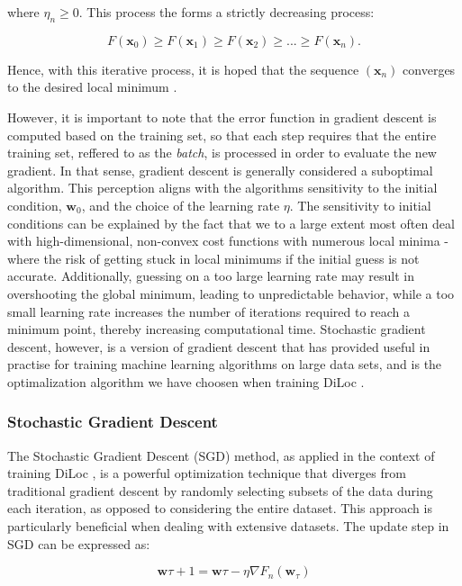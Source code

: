 \documentclass[a4paper, UKenglish, 11pt]{uiomaster}
\begin{document}
where $\eta_n \ge 0$. This process the forms a strictly decreasing process:

\begin{equation}
F(\textbf{x}_0) \ge F(\textbf{x}_1) \ge F(\textbf{x}_2) \ge ... \ge F(\textbf{x}_n).
\end{equation}

Hence, with this iterative process, it is hoped that the sequence $(\textbf{x}_n)$ converges to the desired local minimum \cite{wiki-gradient-descent}.

However, it is important to note that the error function in gradient descent is computed based on the training set, so that each step requires that the entire training set, reffered to as the \emph{batch}, is processed in order to evaluate the new gradient. In that sense, gradient descent is generally considered a suboptimal algorithm. This perception aligns with the algorithms sensitivity to the initial condition, $\textbf{w}_0$, and the choice of the learning rate $\eta$. The sensitivity to initial conditions can be explained by the fact that we to a large extent most often deal with high-dimensional, non-convex cost functions with numerous local minima - where the risk of getting stuck in local minimums if the initial guess is not accurate. Additionally, guessing on a too large learning rate may result in overshooting the global minimum, leading to unpredictable behavior, while a too small learning rate increases the number of iterations required to reach a minimum point, thereby increasing computational time. Stochastic gradient descent, however, is a version of gradient descent that has provided useful in practise for training machine learning algorithms on large data sets, and is the optimalization algorithm we have choosen when training DiLoc \cite{bishop2006pattern}.

\subsubsection{Stochastic Gradient Descent}
The Stochastic Gradient Descent (SGD) method, as applied in the context of training DiLoc \cite{bishop2006pattern}, is a powerful optimization technique that diverges from traditional gradient descent by randomly selecting subsets of the data during each iteration, as opposed to considering the entire dataset. This approach is particularly beneficial when dealing with extensive datasets. The update step in SGD can be expressed as:

\begin{equation}
\textbf{w}{\tau+1} = \textbf{w}{\tau} - \eta\nabla F_n(\textbf{w}_\tau)
\end{equation}
\end{document}
